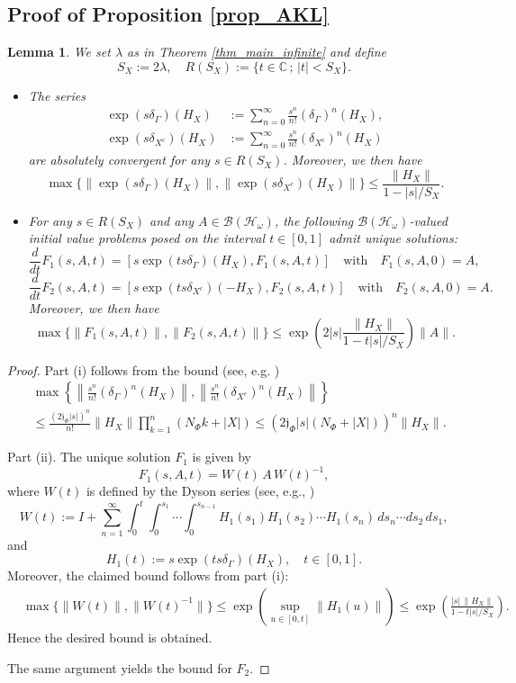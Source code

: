 \documentclass[11pt]{article}
\numberwithin{equation}{section}
\newtheorem{lemma}[theorem]{Lemma}
\begin{document}
\subsection{Proof of Proposition \ref{prop_AKL}}\label{SS_prop_AKL}
\begin{lemma}\label{lem_derivation}
We set $\lambda$ as in Theorem \ref{thm_main_infinite} and define
\[
S_X:=2\lambda,\quad R(S_X):=\{t\in\mathbb{C}\,;\,|t|<S_X\}.
\]
\begin{itemize}
\item[(i)] The series
\begin{align*}
\exp(s\delta_\Gamma)(H_X)
&:=\sum_{n=0}^\infty\frac{s^n}{n!} (\delta_\Gamma)^n(H_X),\\
\exp(s\delta_{X^c})(H_X)
&:=\sum_{n=0}^\infty\frac{s^n}{n!} (\delta_{X^c})^n(H_X)
\end{align*}
are absolutely convergent for any $s\in R(S_X)$. Moreover, we then have
\[
\max\{\|\exp(s\delta_\Gamma)(H_X)\|, \|\exp(s\delta_{X^c})(H_X)\|\}
\leq \frac{\|H_X\|}{1-|s|/S_X}.
\]

\item[(ii)] For any $s\in R(S_X)$ and any $A\in\mathcal{B}(\mathcal{H}_\omega)$, the following
$\mathcal{B}(\mathcal{H}_\omega)$-valued initial value problems posed on the interval $t\in[0,1]$ admit unique solutions:
\[
\frac{d}{dt} F_1(s,A,t)=[s\exp(ts\delta_\Gamma)(H_X),F_1(s,A,t)]
\quad\text{with}\quad F_1(s,A,0)=A,
\]
\[
\frac{d}{dt} F_2(s,A,t)=[s\exp(ts\delta_{X^c})(-H_X),F_2(s,A,t)]
\quad\text{with}\quad F_2(s,A,0)=A.
\]
Moreover, we then have
\[
\max\{\|F_1(s,A,t)\|,\|F_2(s,A,t)\|\}
\leq \exp\left(2|s|\frac{\|H_X\|}{1-t|s|/S_X}\right) \|A\|.
\]
\end{itemize}
\end{lemma}

\begin{proof}
Part (i) follows from the bound (see, e.g. \cite[Lemma 3.3.11]{Naaijkens:book})
\begin{align*}
&\max\left\{
\left\|\frac{s^n}{n!}(\delta_\Gamma)^n(H_X)\right\|,
\left\|\frac{s^n}{n!}(\delta_{X^c})^n(H_X)\right\|
\right\}\\
&\leq \frac{(2\mathfrak{j}_\Phi|s|)^n}{n!} \|H_X\| \prod_{k=1}^n(N_\Phi k+|X|)
\leq (2\mathfrak{j}_\Phi|s|(N_\Phi+|X|))^n \|H_X\|.
\end{align*}

\medskip
Part (ii). The unique solution \(F_1\) is given by
\[
F_1(s,A,t)=W(t)\,A\,W(t)^{-1},
\]
where \(W(t)\) is defined by the Dyson series (see, e.g., \cite[Proposition 2.2]{Nachtergaele-Sims-Young})
\[
W(t):=I+\sum_{n=1}^\infty
\int_0^t \int_0^{s_1} \cdots
\int_0^{s_{n-1}}
H_1(s_1) H_1(s_2) \cdots H_1(s_n)
\,ds_n \cdots ds_2\,ds_1,
\]
and
\[
H_1(t):=s\exp(ts\delta_\Gamma)(H_X),\quad t\in[0,1].
\]
Moreover, the claimed bound follows from part (i):
\begin{align*}
&\max\{\|W(t)\|,\|W(t)^{-1}\|\}
\leq \exp\left(\sup_{u\in[0,t]} \|H_1(u)\|\right)
\leq \exp\left(\frac{|s|\,\|H_X\|}{1-t|s|/S_X}\right).
\end{align*}
Hence the desired bound is obtained.

The same argument yields the bound for $F_2$.
\end{proof}
\end{document}
